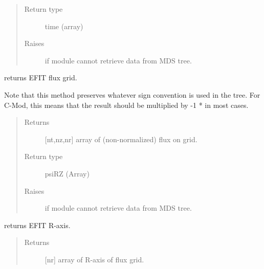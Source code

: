 \documentclass[letterpaper,10pt,english]{sphinxmanual}
\begin{document}
\begin{fulllineitems}
\begin{fulllineitems}
\begin{quote}
\begin{description}
\item[{Return type}] \leavevmode
time (array)

\item[{Raises}] \leavevmode
{} \textendash{} if module cannot retrieve data from MDS tree.

\end{description}\end{quote}

\end{fulllineitems}


\begin{fulllineitems}
\label{\detokenize{eqtools:eqtools.EFIT.EFITTree.getFluxGrid}}
returns EFIT flux grid.

Note that this method preserves whatever sign convention is used in the
tree. For C-Mod, this means that the result should be multiplied by
-1 * {\hyperref[\detokenize{eqtools:eqtools.EFIT.EFITTree.getCurrentSign}]{}} in most cases.
\begin{quote}\begin{description}
\item[{Returns}] \leavevmode
{[}nt,nz,nr{]} array of (non-normalized) flux on grid.

\item[{Return type}] \leavevmode
psiRZ (Array)

\item[{Raises}] \leavevmode
{} \textendash{} if module cannot retrieve data from MDS tree.

\end{description}\end{quote}

\end{fulllineitems}


\begin{fulllineitems}
\label{\detokenize{eqtools:eqtools.EFIT.EFITTree.getRGrid}}
returns EFIT R-axis.
\begin{quote}\begin{description}
\item[{Returns}] \leavevmode
{[}nr{]} array of R-axis of flux grid.


\end{description}
\end{quote}
\end{fulllineitems}
\end{fulllineitems}
\end{document}
